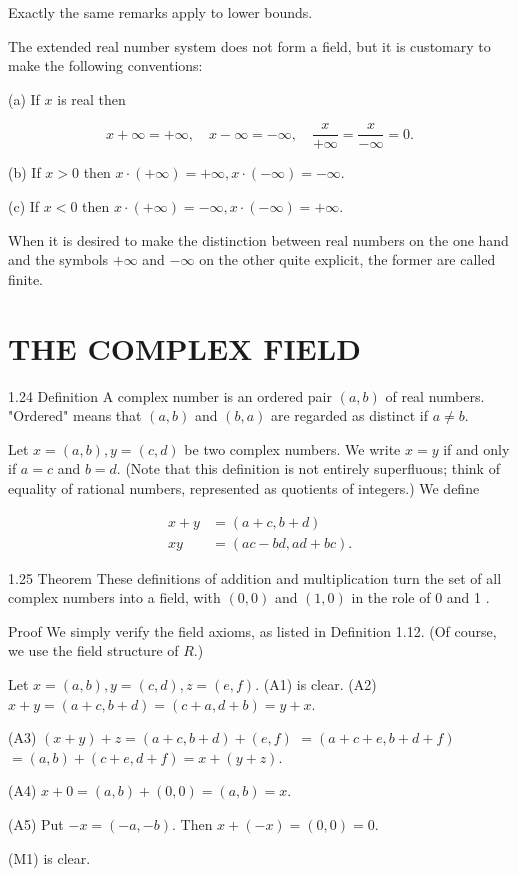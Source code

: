 \documentclass[10pt]{article}
\begin{document}
Exactly the same remarks apply to lower bounds.

The extended real number system does not form a field, but it is customary to make the following conventions:

(a) If $x$ is real then

$$
x+\infty=+\infty, \quad x-\infty=-\infty, \quad \frac{x}{+\infty}=\frac{x}{-\infty}=0 .
$$

(b) If $x>0$ then $x \cdot(+\infty)=+\infty, x \cdot(-\infty)=-\infty$.

(c) If $x<0$ then $x \cdot(+\infty)=-\infty, x \cdot(-\infty)=+\infty$.

When it is desired to make the distinction between real numbers on the one hand and the symbols $+\infty$ and $-\infty$ on the other quite explicit, the former are called finite.

\section{THE COMPLEX FIELD}
1.24 Definition A complex number is an ordered pair $(a, b)$ of real numbers. "Ordered" means that $(a, b)$ and $(b, a)$ are regarded as distinct if $a \neq b$.

Let $x=(a, b), y=(c, d)$ be two complex numbers. We write $x=y$ if and only if $a=c$ and $b=d$. (Note that this definition is not entirely superfluous; think of equality of rational numbers, represented as quotients of integers.) We define

$$
\begin{aligned}
x+y & =(a+c, b+d) \\
x y & =(a c-b d, a d+b c) .
\end{aligned}
$$

1.25 Theorem These definitions of addition and multiplication turn the set of all complex numbers into a field, with $(0,0)$ and $(1,0)$ in the role of 0 and 1 .

Proof We simply verify the field axioms, as listed in Definition 1.12. (Of course, we use the field structure of $R$.)

Let $x=(a, b), y=(c, d), z=(e, f)$.
(A1) is clear.
(A2) $x+y=(a+c, b+d)=(c+a, d+b)=y+x$.

(A3) $(x+y)+z=(a+c, b+d)+(e, f)$ $=(a+c+e, b+d+f)$ $=(a, b)+(c+e, d+f)=x+(y+z)$.

(A4) $x+0=(a, b)+(0,0)=(a, b)=x$.

(A5) Put $-x=(-a,-b)$. Then $x+(-x)=(0,0)=0$.

(M1) is clear.
\end{document}
